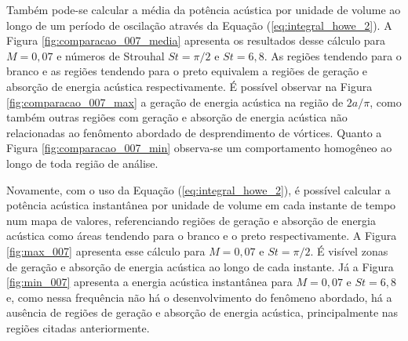 \newpage
Também pode-se calcular a média da potência acústica por unidade de volume ao longo de um período de oscilação através da Equação (\ref{eq:integral_howe_2}). A Figura \ref{fig:comparacao_007_media} apresenta os resultados desse cálculo para $M = 0,07$ e números de Strouhal $St = \pi/2$ e $St = 6,8$. As regiões tendendo para o branco e as regiões tendendo para o preto equivalem a regiões de geração e absorção de energia acústica respectivamente. É possível observar na Figura \ref{fig:comparacao_007_max} a geração de energia acústica na região de $2a/\pi$, como também outras regiões com geração e absorção de energia acústica não relacionadas ao fenômento abordado de desprendimento de vórtices. Quanto a Figura \ref{fig:comparacao_007_min} observa-se um comportamento homogêneo ao longo de toda região de análise.    

Novamente, com o uso da Equação (\ref{eq:integral_howe_2}), é possível calcular a potência acústica instantânea por unidade de volume em cada instante de tempo num mapa de valores, referenciando regiões de geração e absorção de energia acústica como áreas tendendo para o branco e o preto respectivamente. A Figura \ref{fig:max_007} apresenta  esse cálculo para $M = 0,07$ e $St = \pi/2$. É visível zonas de geração e absorção de energia acústica ao longo de cada instante. Já a Figura \ref{fig:min_007} apresenta a energia acústica instantânea para $M = 0,07$ e $St = 6,8$ e, como nessa frequência não há o desenvolvimento do fenômeno abordado, há a ausência de regiões de geração e absorção de energia acústica, principalmente nas regiões citadas anteriormente.

